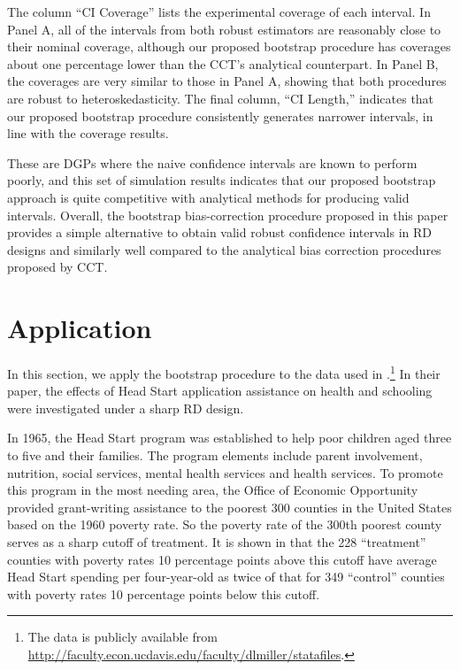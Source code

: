 \documentclass[12pt,fleqn]{article}
\begin{document}
The column ``CI Coverage'' lists the experimental coverage of each interval.
In Panel A, all of the intervals from both robust estimators are reasonably close to their nominal coverage, although
our proposed bootstrap procedure has coverages about one percentage lower than the CCT's analytical counterpart. In Panel B, the coverages are very similar to those in Panel A, showing that both procedures are robust to heteroskedasticity. 
The final column, ``CI Length,'' indicates that our proposed bootstrap procedure consistently generates narrower intervals, in line with the coverage results.

These are DGPs where the naive confidence intervals are known to perform poorly,
and this set of simulation results indicates that our proposed bootstrap approach
is quite competitive with analytical methods for producing valid intervals.
Overall, the bootstrap bias-correction procedure proposed in this paper provides
a simple alternative to obtain valid robust confidence intervals in RD designs
and similarly well compared to the analytical bias correction procedures proposed
by CCT.

\section{Application}\label{application}

In this section, we apply the bootstrap procedure to the data used in
\cite{ludwig2007}.\footnote{%
  The data is publicly available from
  \url{http://faculty.econ.ucdavis.edu/faculty/dlmiller/statafiles}.} %
In their paper, the effects of Head Start application assistance on health and
schooling were investigated under a sharp RD design.

In 1965, the Head Start program was established to help poor children aged three
to five and their families. The program elements include parent involvement,
nutrition, social services, mental health services and health services. To
promote this program in the most needing area, the Office of Economic
Opportunity provided grant-writing assistance to the poorest 300 counties in the
United States based on the 1960 poverty rate. So the poverty rate of the 300th
poorest county serves as a sharp cutoff of treatment. It is shown in
\cite{ludwig2007} that the 228 ``treatment'' counties with poverty rates 10
percentage points above this cutoff have average Head Start spending per
four-year-old as twice of that for 349 ``control'' counties with poverty rates
10 percentage points below this cutoff.
\end{document}
